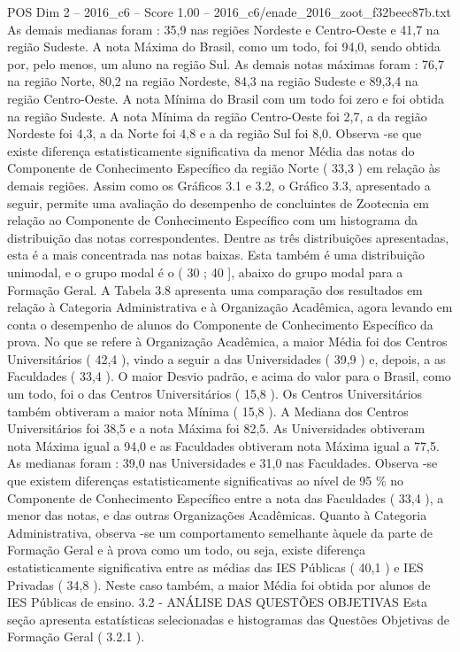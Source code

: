 \begin{textsample}{POS Dim 2 – 2016\_c6 – Score 1.00 – 2016\_c6/enade\_2016\_zoot\_f32beec87b.txt}
As demais medianas foram : 35,9 nas regiões Nordeste e Centro-Oeste e 41,7 na região Sudeste.
A nota Máxima do Brasil, como um todo, foi 94,0, sendo obtida por, pelo menos, um aluno na região Sul.
As demais notas máximas foram : 76,7 na região Norte, 80,2 na região Nordeste, 84,3 na região Sudeste e 89,3,4 na região Centro-Oeste.
A nota Mínima do Brasil com um todo foi zero e foi obtida na região Sudeste.
A nota Mínima da região Centro-Oeste foi 2,7, a da região Nordeste foi 4,3, a da Norte foi 4,8 e a da região Sul foi 8,0.
Observa -se que existe diferença estatisticamente significativa da menor Média das notas do Componente de Conhecimento Específico da região Norte ( 33,3 ) em relação às demais regiões.
Assim como os Gráficos 3.1 e 3.2, o Gráfico 3.3, apresentado a seguir, permite uma avaliação do desempenho de concluintes de Zootecnia em relação ao Componente de Conhecimento Específico com um histograma da distribuição das notas correspondentes.
Dentre as três distribuições apresentadas, esta é a mais concentrada nas notas baixas.
Esta também é uma distribuição unimodal, e o grupo modal é o ( 30 ; 40 ], abaixo do grupo modal para a Formação Geral.
A Tabela 3.8 apresenta uma comparação dos resultados em relação à Categoria Administrativa e à Organização Acadêmica, agora levando em conta o desempenho de alunos do Componente de Conhecimento Específico da prova.
No que se refere à Organização Acadêmica, a maior Média foi dos Centros Universitários ( 42,4 ), vindo a seguir a das Universidades ( 39,9 ) e, depois, a as Faculdades ( 33,4 ).
O maior Desvio padrão, e acima do valor para o Brasil, como um todo, foi o das Centros Universitários ( 15,8 ).
Os Centros Universitários também obtiveram a maior nota Mínima ( 15,8 ).
A Mediana dos Centros Universitários foi 38,5 e a nota Máxima foi 82,5.
As Universidades obtiveram nota Máxima igual a 94,0 e as Faculdades obtiveram nota Máxima igual a 77,5.
As medianas foram : 39,0 nas Universidades e 31,0 nas Faculdades.
Observa -se que existem diferenças estatisticamente significativas ao nível de 95 \% no Componente de Conhecimento Específico entre a nota das Faculdades ( 33,4 ), a menor das notas, e das outras Organizações Acadêmicas.
Quanto à Categoria Administrativa, observa -se um comportamento semelhante àquele da parte de Formação Geral e à prova como um todo, ou seja, existe diferença estatisticamente significativa entre as médias das IES Públicas ( 40,1 ) e IES Privadas ( 34,8 ).
Neste caso também, a maior Média foi obtida por alunos de IES Públicas de ensino. 3.2 - ANÁLISE DAS QUESTÕES OBJETIVAS Esta seção apresenta estatísticas selecionadas e histogramas das Questões Objetivas de Formação Geral ( 3.2.1 ).

\end{textsample}
